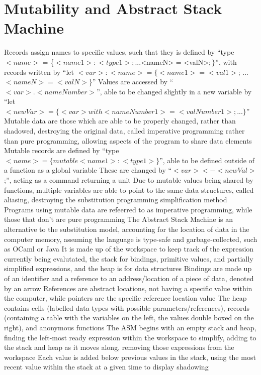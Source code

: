 \documentclass[11 pt, twoside]{article}
\newenvironment{outline*}
{
	\begin{outline}[enumerate]
	}
	{\end{outline}
}
\begin{document}
\section{Mutability and Abstract Stack Machine}
\begin{outline*}
\1 Records assign names to specific values, such that they is defined by ``type $<name>$ = \{$<name1>:<type1>; ...$<nameN> = <valN>$;\}$'', with records written by ``let $<var>: <name> = \{<name1> = <val1>$; ...$<nameN> = <valN>$\}''
	\2 Values are accessed by ``$<var>.<nameNumber>$'', able to be changed slightly in a new variable by ``let $<newVar> = \{<var> with <nameNumber1>=<valNumber1>; ...\}$''
\1 Mutable data are those which are able to be properly changed, rather than shadowed, destroying the original data, called imperative programming rather than pure programming, allowing aspects of the program to share data elements
	\2 Mutable records are defined by ``type $<name> = \{mutable <name1> : <type1>\}$'', able to be defined outside of a function as a global variable
	\2 These are changed by ``$<var> <- <newVal>$;'', acting as a command returning a unit
	\2 Due to mutable values being shared by functions, multiple variables are able to point to the same data structures, called aliasing, destroying the substitution programming simplification method
	\2 Programs using mutable data are refeerred to as imperative programming, while those that don't are pure programming
\1 The Abstract Stack Machine is an alternative to the substitution model, accounting for the location of data in the computer memory, assuming the language is type-safe and garbage-collected, such as OCaml or Java
	\2 It is made up of the workspace to keep track of the expression currently being evalutated, the stack for bindings, primitive values, and partially simplified expressions, and the heap is for data structures
		\3 Bindings are made up of an identifier and a reference to an address/location of a piece of data, denoted by an arrow
			\4 References are abstract locations, not having a specific value within the computer, while pointers are the specific reference location value
		\3 The heap contains cells (labelled data types with possible parameters/references), records (containing a table with the variables on the left, the values double boxed on the right), and anonymous functions
	\2 The ASM begins with an empty stack and heap, finding the left-most ready expression within the workspace to simplify, adding to the stack and heap as it moves along, removing those expressions from the workspace
		\3 Each value is added below previous values in the stack, using the most recent value within the stack at a given time to display shadowing

\end{outline*}
\end{document}
